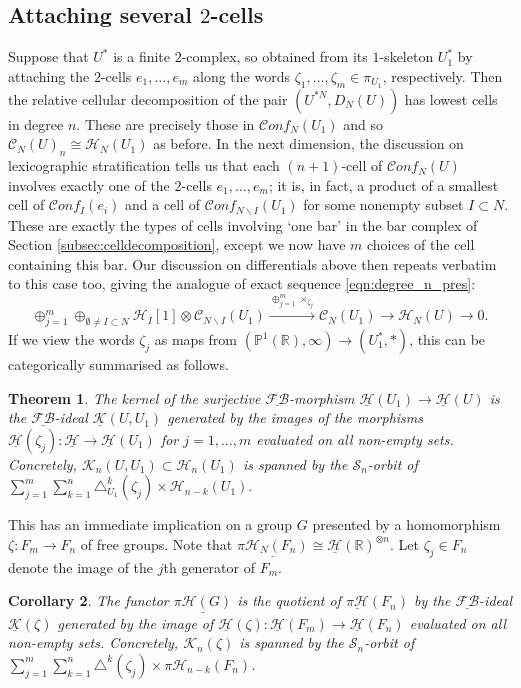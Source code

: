 \documentclass[12pt,letterpaper]{amsart}
\numberwithin{equation}{section}
\def\PP{{\mathbb P}}
\def\RR{{\mathbb R}}
\def\ssm{\smallsetminus}
\def\tri{\triangle}
\def\Hcal{{\mathcal H}}
\def\Kcal{{\mathcal K}}
\def\Scal{{\mathcal S}}
\def\uHcal{{\underline\Hcal}}
\newcommand\FB{\underline{\mathcal {F\!B}}}
\def\Cscr{{\mathscr C}}
\newcommand\conf{\mathscr{C}\!\mathit{onf}\!}
\newtheorem{theorem}{Theorem}[section]
\newtheorem{corollary}[theorem]{Corollary}
\theoremstyle{remark}
\begin{document}
\subsection{Attaching several $2$-cells}
Suppose that $U^*$ is a finite $2$-complex, so obtained from its $1$-skeleton $U_1^*$ by attaching the $2$-cells $e_1,\ldots, e_m$ along the words 
$\zeta_1,\ldots, \zeta_m\in \pi_{U_1}$, respectively. Then the relative cellular decomposition of the pair $(U^{*N}, D_N(U))$ 
has lowest cells in degree $n$. These are precisely those in $\conf_N({U_1})$ and so $\Cscr_N(U)_n\cong \Hcal_N(U_1)$ as before. 
In the next dimension, the discussion on lexicographic stratification tells us that each $(n+1)$-cell of 
$\conf_N(U)$ involves exactly one of the $2$-cells $e_1,\ldots, e_m$; it is, in fact, a product of a smallest cell of $\conf_I(e_i)$ and a cell of $\conf_{N\ssm I}(U_1)$ for some  nonempty subset $I\subset N$. These are exactly the types of cells involving `one bar' in the bar complex of Section \ref{subsec:celldecomposition}, except we now have $m$ choices of the cell containing this bar. Our discussion on differentials above then repeats verbatim to this case too, giving the analogue of exact sequence \eqref{eqn:degree_n_pres}:
\begin{equation}
    \oplus_{j=1}^m\oplus_{\emptyset\not=I\subset N}\Hcal_I[1]\otimes \Cscr_{N\ssm I}(U_1)\xrightarrow{\oplus_{j=1}^m\times_{\zeta_j}} \Cscr_{N}(U_1)\to \Hcal_N(U)\to 0.
\end{equation}
If we view the words $\zeta_j$ as maps from $(\PP^1(\RR), \infty)\to (U_1^*,*)$, this can be categorically summarised as follows.

\begin{theorem}\label{thm:kernelmultiplecells}
The kernel  of the surjective $\FB$-morphism $\uHcal(U_1)\to \uHcal(U)$ is the $\FB$-ideal $\underline{\Kcal}(U,U_1)$ generated by the images of the morphisms $\uHcal(\zeta_j):\uHcal\to \uHcal(U_1)$ for $j=1,\ldots, m$ evaluated on all non-empty sets. Concretely, 
${\Kcal}_n(U,U_1)\subset \Hcal_n(U_1)$ is spanned by the   $\Scal_n$-orbit of $\sum_{j=1}^m\sum_{k=1}^n\tri^k_{U_1}(\zeta_j)\times \Hcal_{n-k}(U_1).$
\end{theorem}

This has an immediate implication on a group $G$ presented by a homomorphism  $\zeta: F_m\to F_n$ of free groups. Note that $\underline{\pi\Hcal_N(F_n)}\cong \uHcal(\RR)^{\otimes n}$. Let $\zeta_j\in F_n$ denote the image of the $j$th generator of $F_m$.

\begin{corollary}\label{cor:kernelmultiplecells-groups}
The  functor $\underline{\pi\Hcal(G)}$ is the quotient of  $\underline{\pi\Hcal}(F_n)$ by the $\FB$-ideal $\underline{\Kcal}(\zeta)$ generated by the image of  $\uHcal(\zeta): \uHcal(F_m)\to \uHcal(F_n)$ evaluated on all non-empty sets. Concretely, 
${\Kcal}_n(\zeta)$ is spanned by the   $\Scal_n$-orbit of $\sum_{j=1}^m\sum_{k=1}^n\tri^k(\zeta_j)\times 
\pi\Hcal_{n-k}(F_n)$.
\end{corollary}
\end{document}
